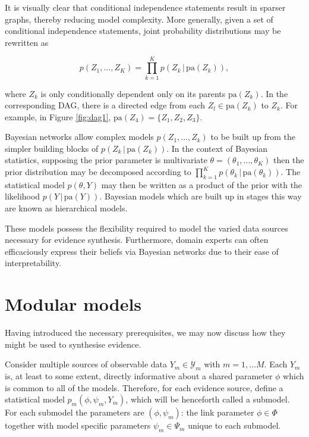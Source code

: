 \documentclass[11pt,]{book}
\begin{document}
It is visually clear that conditional independence statements result in
sparser graphs, thereby reducing model complexity. More generally, given
a set of conditional independence statements, joint probability
distributions may be rewritten as

\begin{equation}
p(Z_1, \ldots, Z_K) = \prod_{k=1}^K p(Z_k \, | \, \text{pa}(Z_k)),
\end{equation}

where \(Z_k\) is only conditionally dependent only on its parents
\(\text{pa}(Z_k)\). In the corresponding DAG, there is a directed edge
from each \(Z_l \in \text{pa}(Z_k)\) to \(Z_k\). For example, in Figure
\ref{fig:dag1}, \(\text{pa}(Z_4) = \{Z_1, Z_2, Z_3\}\).

Bayesian networks allow complex models \(p(Z_1, \ldots, Z_k)\) to be
built up from the simpler building blocks of
\(p(Z_k \, | \, \text{pa}(Z_k))\). In the context of Bayesian
statistics, supposing the prior parameter is multivariate
\(\theta = (\theta_1, \ldots, \theta_K)\) then the prior distribution
may be decomposed according to
\(\prod_{k=1}^K p(\theta_k \, | \, \text{pa}(\theta_k))\). The
statistical model \(p(\theta, Y)\) may then be written as a product of
the prior with the likelihood \(p(Y \, | \, \text{pa}(Y))\). Bayesian
models which are built up in stages this way are known as hierarchical
models.

These models possess the flexibility required to model the varied data
sources necessary for evidence synthesis. Furthermore, domain experts
can often efficaciously express their beliefs via Bayesian networks due
to their ease of interpretability.

\section{Modular models}\label{modular-models}

Having introduced the necessary prerequisites, we may now discuss how
they might be used to synthesise evidence.

Consider multiple sources of observable data \(Y_m \in \mathcal{Y}_m\)
with \(m = 1, \ldots M\). Each \(Y_m\) is, at least to some extent,
directly informative about a shared parameter \(\phi\) which is common
to all of the models. Therefore, for each evidence source, define a
statistical model \(p_m(\phi, \psi_m, Y_m)\), which will be henceforth
called a submodel. For each submodel the parameters are
\((\phi, \psi_m)\): the link parameter \(\phi \in \Phi\) together with
model specific parameters \(\psi_m \in \Psi_m\) unique to each submodel.
\end{document}
